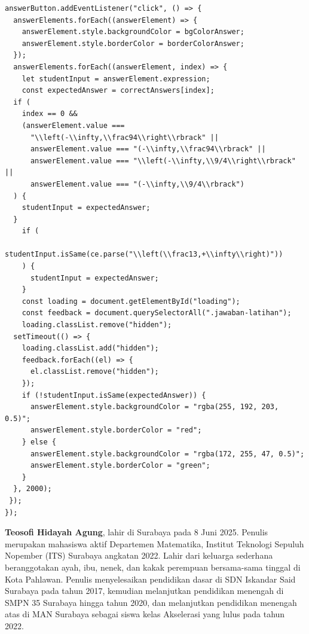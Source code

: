 \documentclass{file/KP-ITS}
\theoremstyle{definition}
\theoremstyle{definition}
\theoremstyle{plain}
\begin{document}
\begin{verbatim}
answerButton.addEventListener("click", () => {
  answerElements.forEach((answerElement) => {
    answerElement.style.backgroundColor = bgColorAnswer;
    answerElement.style.borderColor = borderColorAnswer;
  });
  answerElements.forEach((answerElement, index) => {
    let studentInput = answerElement.expression;
    const expectedAnswer = correctAnswers[index];
  if (
    index == 0 &&
    (answerElement.value ===
      "\\left(-\\infty,\\frac94\\right\\rbrack" ||
      answerElement.value === "(-\\infty,\\frac94\\rbrack" ||
      answerElement.value === "\\left(-\\infty,\\9/4\\right\\rbrack" ||
      answerElement.value === "(-\\infty,\\9/4\\rbrack")
  ) {
    studentInput = expectedAnswer;
  }
    if (
      studentInput.isSame(ce.parse("\\left(\\frac13,+\\infty\\right)"))
    ) {
      studentInput = expectedAnswer;
    }
    const loading = document.getElementById("loading");
    const feedback = document.querySelectorAll(".jawaban-latihan");
    loading.classList.remove("hidden");
  setTimeout(() => {
    loading.classList.add("hidden");
    feedback.forEach((el) => {
      el.classList.remove("hidden");
    });
    if (!studentInput.isSame(expectedAnswer)) {
      answerElement.style.backgroundColor = "rgba(255, 192, 203, 0.5)";
      answerElement.style.borderColor = "red";
    } else {
      answerElement.style.backgroundColor = "rgba(172, 255, 47, 0.5)";
      answerElement.style.borderColor = "green";
    }
  }, 2000);
 });
});
\end{verbatim}

\cleardoublepage
{}
\textbf{Teosofi Hidayah Agung}, lahir di Surabaya pada 8 Juni 2025. Penulis merupakan mahasiswa aktif Departemen Matematika, Institut Teknologi Sepuluh Nopember (ITS) Surabaya angkatan 2022. Lahir dari keluarga sederhana beranggotakan ayah, ibu, nenek, dan kakak perempuan bersama-sama tinggal di Kota Pahlawan. Penulis menyelesaikan pendidikan dasar di SDN Iskandar Said Surabaya pada tahun 2017, kemudian melanjutkan pendidikan menengah di SMPN 35 Surabaya hingga tahun 2020, dan melanjutkan pendidikan menengah atas di MAN Surabaya sebagai siswa kelas Akselerasi yang lulus pada tahun 2022. 
\end{document}
